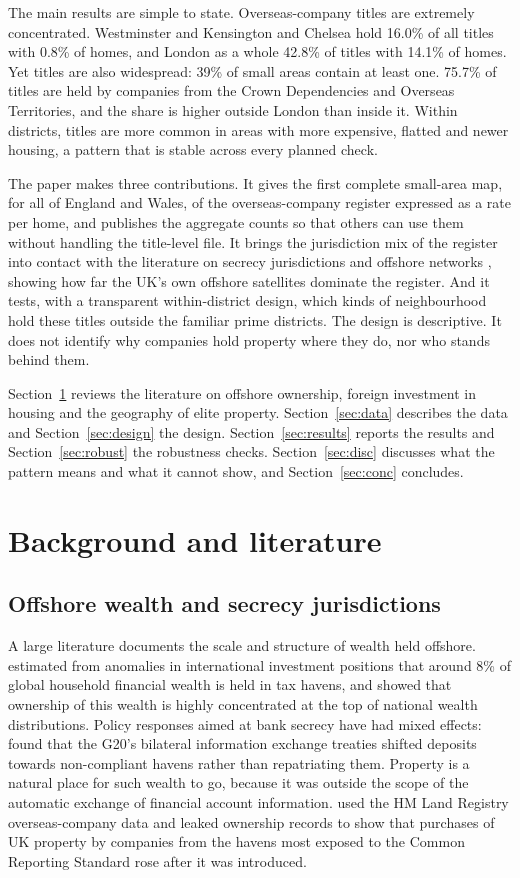 \documentclass[11pt,a4paper]{article}
\begin{document}
The main results are simple to state. Overseas-company titles are extremely concentrated. Westminster and Kensington and Chelsea hold 16.0\% of all titles with 0.8\% of homes, and London as a whole 42.8\% of titles with 14.1\% of homes. Yet titles are also widespread: 39\% of small areas contain at least one. 75.7\% of titles are held by companies from the Crown Dependencies and Overseas Territories, and the share is higher outside London than inside it. Within districts, titles are more common in areas with more expensive, flatted and newer housing, a pattern that is stable across every planned check.

The paper makes three contributions. It gives the first complete small-area map, for all of England and Wales, of the overseas-company register expressed as a rate per home, and publishes the aggregate counts so that others can use them without handling the title-level file. It brings the jurisdiction mix of the register into contact with the literature on secrecy jurisdictions and offshore networks \citep{cobham2015,garcia2017}, showing how far the UK's own offshore satellites dominate the register. And it tests, with a transparent within-district design, which kinds of neighbourhood hold these titles outside the familiar prime districts. The design is descriptive. It does not identify why companies hold property where they do, nor who stands behind them.

Section~\ref{sec:lit} reviews the literature on offshore ownership, foreign investment in housing and the geography of elite property. Section~\ref{sec:data} describes the data and Section~\ref{sec:design} the design. Section~\ref{sec:results} reports the results and Section~\ref{sec:robust} the robustness checks. Section~\ref{sec:disc} discusses what the pattern means and what it cannot show, and Section~\ref{sec:conc} concludes.

\section{Background and literature}\label{sec:lit}
\subsection{Offshore wealth and secrecy jurisdictions}
A large literature documents the scale and structure of wealth held offshore. \citet{zucman2013} estimated from anomalies in international investment positions that around 8\% of global household financial wealth is held in tax havens, and \citet{alstadsaeter2018} showed that ownership of this wealth is highly concentrated at the top of national wealth distributions. Policy responses aimed at bank secrecy have had mixed effects: \citet{johannesen2014} found that the G20's bilateral information exchange treaties shifted deposits towards non-compliant havens rather than repatriating them. Property is a natural place for such wealth to go, because it was outside the scope of the automatic exchange of financial account information. \citet{bomare2022} used the HM Land Registry overseas-company data and leaked ownership records to show that purchases of UK property by companies from the havens most exposed to the Common Reporting Standard rose after it was introduced.
\end{document}
